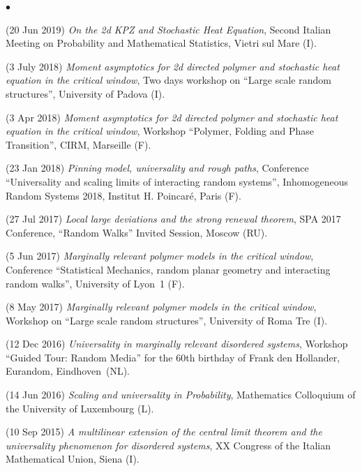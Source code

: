 \documentclass[a4paper,11pt,oneside]{amsart}
\newenvironment{myitemize}{%
\begin{list}{$\bullet$}%
 	{%
	\setlength{\itemsep}{0.3em}%
	\setlength{\topsep}{0.3em}%
	\setlength{\partopsep}{0em}%
	\setlength{\parsep}{0em}%
	\setlength{\parskip}{0em}%
	\setlength\leftmargin{1.5em}%
	\setlength\labelwidth{1.1em}%
	\setlength{\labelsep}{0.4em}%
	}%
	}%
{\end{list}}
\renewenvironment{itemize}{
\begin{myitemize}}%
{\end{myitemize}}
\begin{document}
\begin{itemize}
\item (20 Jun 2019)
\emph{On the 2d KPZ and Stochastic Heat Equation},
Second Italian Meeting on Probability and Mathematical Statistics,
Vietri sul Mare (I).

\item (3 July 2018)
\emph{Moment asymptotics for 2d directed polymer and stochastic heat equation in the critical window},
Two days workshop on ``Large scale random structures'',
University of Padova (I).

\item (3 Apr 2018)
\emph{Moment asymptotics for 2d directed polymer and stochastic 
heat equation in the critical window},
Workshop ``Polymer, Folding and Phase Transition'', CIRM, Marseille (F).

\item (23 Jan 2018)
\emph{Pinning model, universality and rough paths},
Conference ``Universality and scaling limits of interacting random systems'',
Inhomogeneous Random Systems 2018, Institut H. Poincar\'e, Paris (F).

\item (27 Jul 2017)
\emph{Local large deviations and the strong renewal theorem},
SPA 2017 Conference, ``Random Walks'' Invited Session, Moscow (RU).

\item (5 Jun 2017)
\emph{Marginally relevant polymer models in the critical window},
Conference ``Statistical Mechanics, random planar geometry and interacting random walks'',
University of Lyon~1 (F).

\item (8 May 2017)
\emph{Marginally relevant polymer models in the critical window},
Workshop on ``Large scale random structures'',
University of Roma Tre (I).

\item (12 Dec 2016)
\emph{Universality in marginally relevant disordered systems},
Workshop ``Guided Tour: Random Media'' for the 60th birthday of Frank den Hollander,
Eurandom, Eindhoven~(NL).

\item (14 Jun 2016)
\emph{Scaling and universality in Probability},
Mathematics Colloquium of the University of Luxembourg (L).

\item (10 Sep 2015)
\emph{A multilinear extension of the central limit theorem
and the universality phenomenon for disordered systems},
XX Congress of the Italian Mathematical Union, Siena (I).


\end{itemize}
\end{document}
